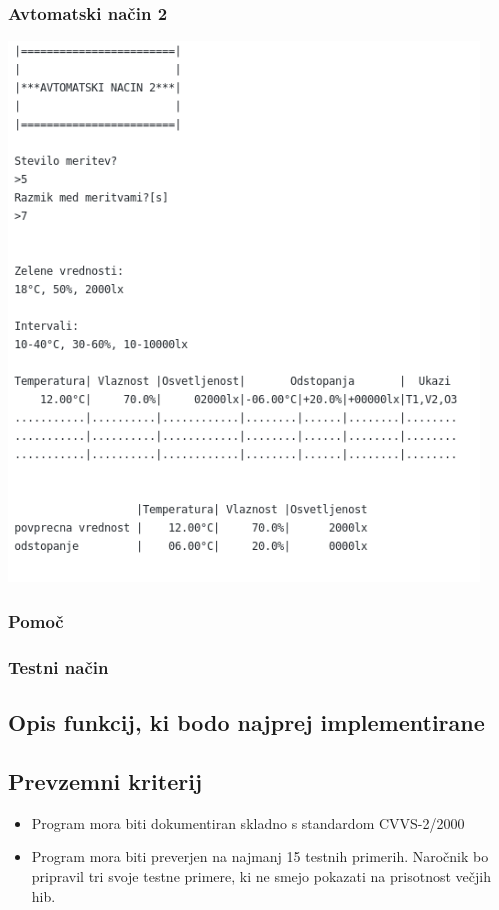 \documentclass[a4paper,12pt]{article}
\begin{document}
\newpage

			\subsubsection{Avtomatski način 2}

				\includegraphics[width=12.5cm]{diagrami_slike/avt_nac2.png}

			\subsubsection{Pomoč}

			\subsubsection{Testni način}
			

		\subsection{Opis funkcij, ki bodo najprej implementirane}

		\subsection{Prevzemni kriterij}

			\begin{itemize}
				\item Program mora biti dokumentiran skladno s standardom CVVS-2/2000
				\item Program mora biti preverjen na najmanj 15 testnih primerih. 
				Naročnik bo pripravil tri svoje testne primere, ki ne smejo pokazati na prisotnost večjih hib.
			\end{itemize}
\end{document}
